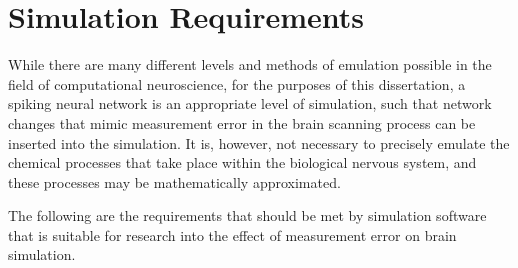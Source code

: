 \section{Simulation Requirements}


While there are many different levels and methods of emulation possible in the
field of computational neuroscience, for the purposes of this dissertation, a
spiking neural network is an appropriate level of simulation, such that network
changes that mimic measurement error in the brain scanning process can be
inserted into the simulation. It is, however, not necessary to precisely emulate
the chemical processes that take place within the biological nervous system, and
these processes may be mathematically approximated.

The following are the requirements that should be met by simulation software
that is suitable for research into the effect of measurement error on brain
simulation.


